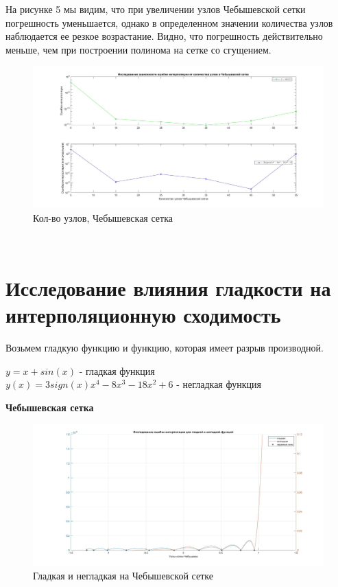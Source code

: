 \documentclass[a4paper]{article}
\begin{document}
На рисунке 5 мы видим, что при увеличении узлов Чебышевской сетки погрешность уменьшается, однако в определенном значении количества узлов наблюдается ее резкое возрастание. Видно, что погрешность действительно меньше, чем при построении полинома на  сетке со сгущением. 
\begin{figure}[h!]
\begin{center}
\includegraphics[scale=0.3]{кол-во узлов Чебышев.jpg} 
\end{center}
\caption{Кол-во узлов, Чебышевская сетка} \label{Рис5}
\end{figure}\\

\newpage
\section{Исследование влияния гладкости на интерполяционную сходимость} 
Возьмем гладкую функцию и функцию, которая имеет разрыв производной.
 \begin{center}
$ y = x+sin(x)$  - гладкая функция\\
$ y(x) = 3sign(x)x^{4}-8x^{3}-18x^{2}+6$ - негладкая функция
\end{center}


 

\textbf{Чебышевская сетка}
\begin{figure}[h!]
\begin{center}
\includegraphics[scale=0.3] {гладкая и негладкая чебышев.jpg} 
\end{center}
\caption{Гладкая и негладкая на Чебышевской сетке} \label{Рис5}
\end{figure}\\
\end{document}
